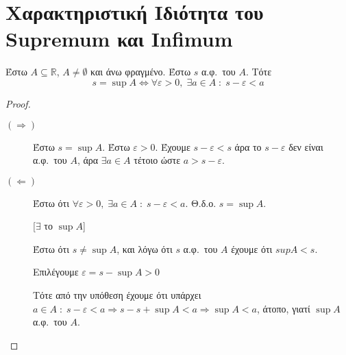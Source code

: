 \section{Χαρακτηριστική Ιδιότητα του Supremum και Infimum}

\begin{mybox3}
\begin{prop}
  Έστω $ A \subseteq \mathbb{R} $, $ A \neq \emptyset $ και άνω φραγμένο. 
  Έστω $ s $ α.φ.\ του $A$. Τότε 
  \[
    s= \sup A \Leftrightarrow \forall \varepsilon >0, \; \exists a \in A \; 
    : \; s - \varepsilon < a
  \]
\end{prop}
\end{mybox3}
\begin{proof}
\item {}
  \begin{description}
    \item[$ (\Rightarrow) $] 
      Έστω $ s = \sup A $. Έστω $ \varepsilon >0 $. Έχουμε $ 
      s - \varepsilon < s $ άρα το $ s- \varepsilon $ δεν είναι 
      α.φ.\ του $A$, άρα $ \exists a \in A $ τέτοιο ώστε $ 
      a > s- \varepsilon$. 

    \item [$ (\Leftarrow) $] 
      Έστω ότι $ \forall \varepsilon >0, \; \exists a \in A \; : 
      \; s- \varepsilon < a$. Θ.δ.ο. $ s = \sup A $. 

      \begin{minipage}{0.18\textwidth}
      \end{minipage}

      [$ \exists $ το $ \sup A $]

      Έστω ότι $ s \neq \sup A $, και λόγω ότι $ s $ α.φ.\ του $A$ 
      έχουμε ότι $sup A < s $. 

      Επιλέγουμε $ \varepsilon = s - \sup A > 0 $

      Τότε από την υπόθεση έχουμε ότι 
      υπάρχει $ a \in A \; : \; s - \varepsilon < a \Rightarrow s 
      - s + \sup A < a \Rightarrow \sup A < a $, άτοπο, γιατί 
      $ \sup A $ α.φ.\ του $A$.  
  \end{description} 
\end{proof}


